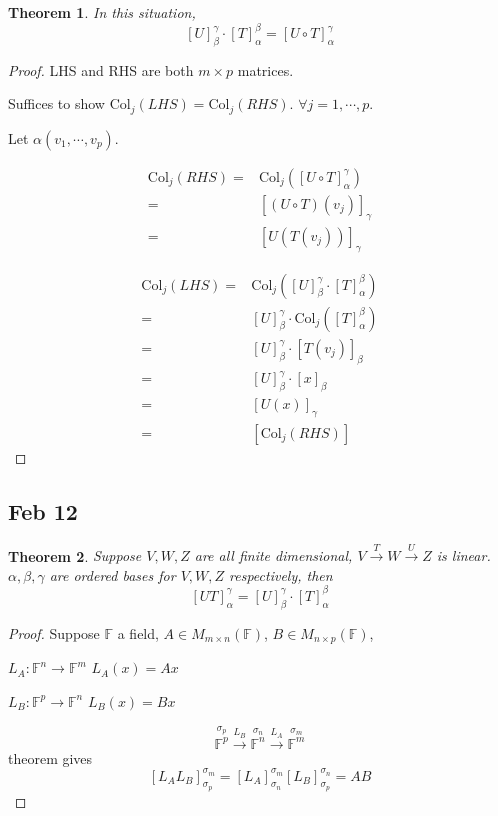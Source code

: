 \documentclass[12pt]{article}
\newtheorem{theorem}{Theorem}[subsection]
\newcommand{\Col}{\mathrm{Col}}
\newcommand{\mF}{{\mathbb{F}}}
\begin{document}
	\begin{theorem}
		In this situation, 
		\[
			[U]_{\beta}^{\gamma}\cdot 
			[T]_{\alpha}^{\beta} = [U\circ T]_{\alpha}^{\gamma} 
		\]
	\end{theorem}
	\begin{proof}
		LHS and RHS are both $m\times p$ matrices. 

		Suffices to show $\Col_j(LHS)= \Col_j(RHS)$. $\forall j = 1, \cdots, p$.
		
		Let $\alpha(v_1,\cdots, v_p)$. 

		\begin{align*}
			\Col_j(RHS) 
			=& \Col_j([U\circ T]_{\alpha}^{\gamma})\\
			=& [(U\circ T)(v_j)]_{\gamma}\\
			=& [U(T(v_j))]_{\gamma}
		\end{align*}

		\begin{align*}
			\Col_j(LHS) 
			=& \Col_j([U]_{\beta}^{\gamma} \cdot [T]_{\alpha}^{\beta})\\
			=& [U]_{\beta}^{\gamma} \cdot \Col_j([T]_{\alpha}^{\beta})\\
			=& [U]_{\beta}^{\gamma} \cdot [T(v_j)]_{\beta}\\
			=& [U]_{\beta}^{\gamma} \cdot [x]_{\beta}
			 \tag{$x = T(v_j)$}\\
			=& [U(x)]_{\gamma}\\
			=& [\Col_j(RHS)]
		\end{align*}
	\end{proof}
	
	\subsection{Feb 12}
	\begin{theorem}
		Suppose $V,W,Z$ are all finite dimensional, 
		$V\overset{T}{\longrightarrow} W\overset{U}{\longrightarrow} Z$ is linear. 
		$\alpha, \beta, \gamma$ are ordered bases for $V,W,Z$ respectively, 
		then 
		\[
			[UT] _{\alpha}^{\gamma} 
			= [U]_{\beta}^{\gamma} \cdot[T]_{\alpha}^{\beta}
		\]
	\end{theorem}
	\begin{proof}
		Suppose $\mF$ a field, $A\in M_{m\times n}(\mF)$, 
		$B\in M_{n\times p} (\mF)$, 
		\begin{description}
			\item $L_A: \mF^n \to \mF^m $ $L_A(x) = Ax$
			\item $L_B: \mF^p \to \mF^n$ $L_B(x) = Bx$
		\end{description}
		\[
			\overset{\sigma_p}{\mF^p} \overset{L_B}{\longrightarrow}
			\overset{\sigma_n}{\mF^n} \overset{L_A}{\longrightarrow} 
			\overset{\sigma_m}{\mF^m}
		\]
		theorem gives
		\[
			[L_AL_B]_{\sigma_p}^{\sigma_m}
			=[L_A]_{\sigma_n}^{\sigma_m} \left[L_B\right]_{\sigma_p}^{\sigma_n}
			= AB
		\]
	\end{proof}
\end{document}
